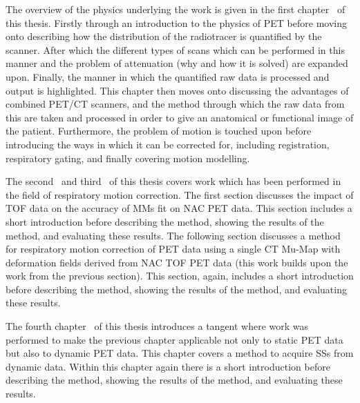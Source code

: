         The overview of the physics underlying the work is given in the first chapter~ of this thesis. Firstly through an introduction to the physics of \gls{PET} before moving onto describing how the distribution of the radiotracer is quantified by the scanner. After which the different types of scans which can be performed in this manner and the problem of attenuation (why and how it is solved) are expanded upon. Finally, the manner in which the quantified raw data is processed and output is highlighted. This chapter then moves onto discussing the advantages of combined \gls{PET}/\gls{CT} scanners, and the method through which the raw data from this are taken and processed in order to give an anatomical or functional image of the patient. Furthermore, the problem of motion is touched upon before introducing the ways in which it can be corrected for, including registration, respiratory gating, and finally covering motion modelling.
        
        The second~ and third~ of this thesis covers work which has been performed in the field of respiratory motion correction. The first section discusses the impact of \gls{TOF} data on the accuracy of \glspl{MM} fit on \gls{NAC} \gls{PET} data. This section includes a short introduction before describing the method, showing the results of the method, and evaluating these results. The following section discusses a method for respiratory motion correction of \gls{PET} data using a single \gls{CT} \gls{Mu-Map} with deformation fields derived from \gls{NAC} \gls{TOF} \gls{PET} data (this work builds upon the work from the previous section). This section, again, includes a short introduction before describing the method, showing the results of the method, and evaluating these results.
        
        The fourth chapter~ of this thesis introduces a tangent where work was performed to make the previous chapter applicable not only to static \gls{PET} data but also to dynamic \gls{PET} data. This chapter covers a method to acquire \glspl{SS} from dynamic data. %
        Within this chapter again there is a short introduction before describing the method, showing the results of the method, and evaluating these results.
        
